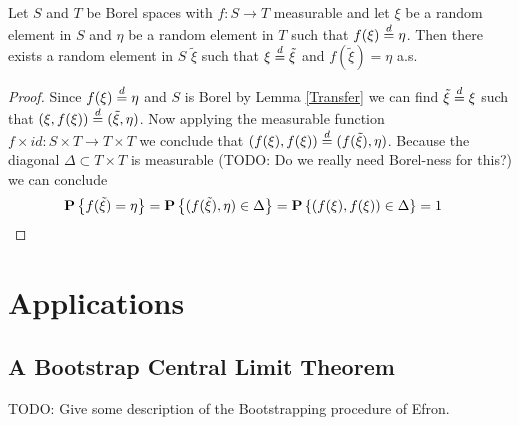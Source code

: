 \begin{lem}\label{SolvingStochasticEquations}Let $S$ and $T$ be Borel spaces with $f : S \to T$
  measurable and let $\xi$ be a random
  element in $S$ and $\eta$ be a random element in $T$ such that
  $f(\xi) \overset{d}= \eta$.  Then there exists a random element in $S$
  $\tilde{\xi}$ such that $\xi \overset{d}= \tilde{\xi}$ and $f(\tilde{\xi}) = \eta$ a.s.
\end{lem}
\begin{proof}
Since $f(\xi) \overset{d}= \eta$ and $S$ is Borel by Lemma \ref{Transfer}
we can find $\tilde{\xi} \overset{d}= \xi$ such that $(\xi, f(\xi)) \overset{d}=
(\tilde{\xi}, \eta)$.  Now applying the measurable function $f \times
id : S \times T \to T \times T$ we conclude that $(f(\xi), f(\xi))
\overset{d}= (f(\tilde{\xi}), \eta)$.  Because the diagonal $\Delta \subset
T \times T$ is measurable (TODO: Do we really need Borel-ness for
this?) we can conclude 
\begin{align*}
\textbf{P}\left \{f(\tilde{\xi}) = \eta \right \} &= \textbf{P}\left \{(f(\tilde{\xi}),
  \eta) \in \Delta \right \} = 
\textbf{P}\left \{(f(\xi), f(\xi)) \in \Delta \right \} =1
\end{align*}
\end{proof}


\section{Applications}

\subsection{A Bootstrap Central Limit Theorem}

TODO: Give some description of the Bootstrapping procedure of Efron.

